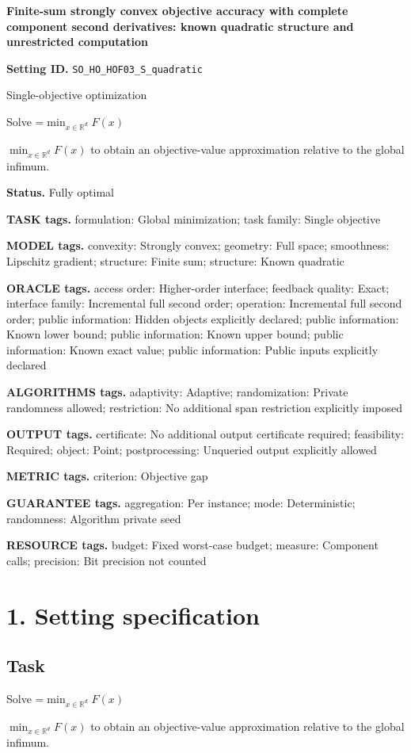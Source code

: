 \documentclass[10pt,a4paper]{article}
\newcommand{\AtlasMath}[1]{\par\begingroup\centering\setbox0=\hbox{$\displaystyle #1$}\ifdim\wd0>1.4\linewidth\typeout{ATLAS WIDE FORMULA: \the\wd0}\fi\ifdim\wd0>\linewidth\resizebox{\linewidth}{!}{\box0}\else\box0\fi\par\endgroup}
\newcommand{\AtlasInlineMath}[1]{\begingroup\setbox0=\hbox{$#1$}\ifdim\wd0>.4\linewidth\endgroup\AtlasMath{#1}\else\endgroup$#1$\fi}
\begin{document}
\raggedright

{\LARGE\bfseries\sffamily\color{AtlasNavy} Finite-sum strongly convex objective accuracy with complete component second derivatives: known quadratic structure and unrestricted computation\par}\vspace{5pt}
\textbf{Setting ID.} \texttt{SO\_\allowbreak{}HO\_\allowbreak{}HOF03\_\allowbreak{}S\_\allowbreak{}quadratic}

Single-objective optimization

Solve \AtlasInlineMath{\min_{x\in \mathbb{R}^d}F(x)} to obtain an objective-value approximation relative to the global infimum.

\textbf{Status.} Fully optimal

\textbf{TASK tags.} formulation: Global minimization; task family: Single objective

\textbf{MODEL tags.} convexity: Strongly convex; geometry: Full space; smoothness: Lipschitz gradient; structure: Finite sum; structure: Known quadratic

\textbf{ORACLE tags.} access order: Higher-order interface; feedback quality: Exact; interface family: Incremental full second order; operation: Incremental full second order; public information: Hidden objects explicitly declared; public information: Known lower bound; public information: Known upper bound; public information: Known exact value; public information: Public inputs explicitly declared

\textbf{ALGORITHMS tags.} adaptivity: Adaptive; randomization: Private randomness allowed; restriction: No additional span restriction explicitly imposed

\textbf{OUTPUT tags.} certificate: No additional output certificate required; feasibility: Required; object: Point; postprocessing: Unqueried output explicitly allowed

\textbf{METRIC tags.} criterion: Objective gap

\textbf{GUARANTEE tags.} aggregation: Per instance; mode: Deterministic; randomness: Algorithm private seed

\textbf{RESOURCE tags.} budget: Fixed worst-case budget; measure: Component calls; precision: Bit precision not counted

\section{1. Setting specification}
\subsection{Task}
Solve \AtlasInlineMath{\min_{x\in \mathbb{R}^d}F(x)} to obtain an objective-value approximation relative to the global infimum.
\end{document}
